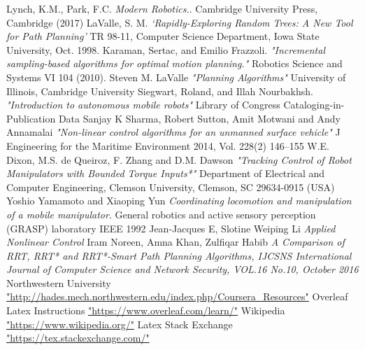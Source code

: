 \documentclass[12pt]{article}
\begin{document}
\begin{thebibliography}{9}
Lynch, K.M., Park, F.C.
\textit{Modern Robotics.}. 
Cambridge University Press, Cambridge (2017)
LaValle, S. M.
\textit{‘Rapidly-Exploring Random Trees: A New Tool for Path Planning’}
TR 98-11, Computer Science Department, Iowa State University, Oct. 1998.
Karaman, Sertac, and Emilio Frazzoli.
\textit{"Incremental sampling-based algorithms for optimal motion planning."}
Robotics Science and Systems VI 104 (2010).
Steven M. LaValle
\textit{"Planning Algorithms"}
University of Illinois, Cambridge University
Siegwart, Roland, and Illah Nourbakhsh.
\textit{"Introduction to autonomous mobile robots"}
Library of Congress Cataloging-in-Publication Data
Sanjay K Sharma, Robert Sutton, Amit Motwani and Andy Annamalai
\textit{"Non-linear control algorithms for an
unmanned surface vehicle"}
J Engineering for the Maritime Environment
2014, Vol. 228(2) 146–155
 W.E. Dixon, M.S. de Queiroz, F. Zhang and D.M. Dawson
\textit{"Tracking Control of Robot Manipulators with Bounded Torque Inputs*"}
Department of Electrical and Computer Engineering, Clemson University, Clemson, SC 29634-0915 (USA)
Yoshio Yamamoto and Xiaoping Yun
\textit{Coordinating
locomotion and manipulation of a mobile manipulator}. 
General robotics and active sensory perception (GRASP) laboratory IEEE 1992
Jean-Jacques E, Slotine Weiping Li
\textit{Applied Nonlinear Control}
Iram Noreen, Amna Khan, Zulfiqar Habib
\textit{A Comparison of RRT, RRT* and RRT*-Smart Path Planning
Algorithms, IJCSNS International Journal of Computer Science and Network Security, VOL.16 No.10, October 2016}
Northwestern University
\url{"http://hades.mech.northwestern.edu/index.php/Coursera_Resources"}
Overleaf Latex Instructions
\url{"https://www.overleaf.com/learn/"}
Wikipedia
\url{"https://www.wikipedia.org/"}
Latex Stack Exchange
\url{"https://tex.stackexchange.com/"}
\end{thebibliography}
\end{document}
